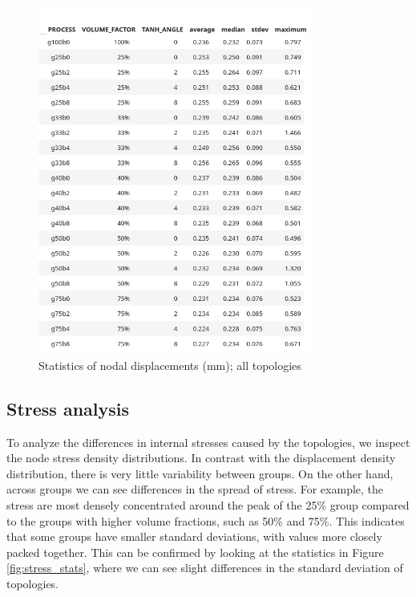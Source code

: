 \documentclass[../main.tex]{subfiles}
\begin{document}
\begin{figure}[h!]
  \centering 
  \includegraphics[width=0.8\textwidth]{images/results/plots/femoral/displacement/statistics.png}
  \caption{Statistics of nodal displacements (mm); all topologies}
  \label{fig:disp_stats}
\end{figure}

\clearpage
\subsection{Stress analysis}

To analyze the differences in internal stresses caused by the topologies, we inspect the node stress density distributions. In contrast with the displacement density distribution, there is very little variability between groups. On the other hand, across groups we can see differences in the spread of stress. For example, the stress are most densely concentrated around the peak of the 25\% group compared to the groups with higher volume fractions, such as 50\% and 75\%. This indicates that some groups have smaller standard deviations, with values more closely packed together. This can be confirmed by looking at the statistics in  
Figure \ref{fig:stress_stats}, where we can see slight differences in the standard deviation of topologies.
\end{document}

